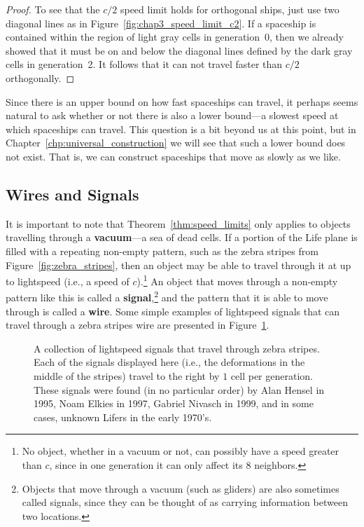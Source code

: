 \begin{proof}
	To see that the $c/2$ speed limit holds for orthogonal ships, just use two diagonal lines as in Figure~\ref{fig:chap3_speed_limit_c2}. If a spaceship is contained within the region of light gray cells in generation~0, then we already showed that it must be on and below the diagonal lines defined by the dark gray cells in generation~2. It follows that it can not travel faster than $c/2$ orthogonally.
\end{proof}

Since there is an upper bound on how fast spaceships can travel, it perhaps seems natural to ask whether or not there is also a lower bound---a slowest speed at which spaceships can travel. This question is a bit beyond us at this point, but in Chapter~\ref{chp:universal_construction} we will see that such a lower bound does not exist. That is, we can construct spaceships that move as slowly as we like.


\subsection{Wires and Signals}\label{sec:wires_signals}

It is important to note that Theorem~\ref{thm:speed_limits} only applies to objects travelling through a \textbf{vacuum}---a sea of dead cells. If a portion of the Life plane is filled with a repeating non-empty pattern, such as the zebra stripes from Figure~\ref{fig:zebra_stripes}, then an object may be able to travel through it at up to lightspeed (i.e., a speed of $c$).\footnote{No object, whether in a vacuum or not, can possibly have a speed greater than $c$, since in one generation it can only affect its $8$ neighbors.} An object that moves through a non-empty pattern like this is called a \textbf{signal},\footnote{Objects that move through a vacuum (such as gliders) are also sometimes called signals, since they can be thought of as carrying information between two locations.} and the pattern that it is able to move through is called a \textbf{wire}. Some simple examples of lightspeed signals that can travel through a zebra stripes wire are presented in Figure~\ref{fig:lightspeed_signals}.

\begin{figure}[!htb]
	\centering{}
	\caption{A collection of lightspeed signals that travel through zebra stripes. Each of the signals displayed here (i.e., the deformations in the middle of the stripes) travel to the right by $1$ cell per generation. These signals were found (in no particular order) by Alan Hensel in 1995, Noam Elkies in 1997, Gabriel Nivasch in 1999, and in some cases, unknown Lifers in the early 1970's.}\label{fig:lightspeed_signals}
\end{figure}

